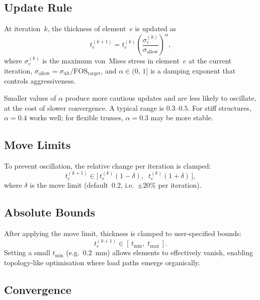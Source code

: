 \subsection{Update Rule}

At iteration~$k$, the thickness of element~$e$ is updated as
%
\begin{equation}
\label{eq:fsd_update}
    t^{(k+1)}_e = t^{(k)}_e \left( \frac{\sigma^{(k)}_e}{\sigma_{\text{allow}}} \right)^{\!\alpha},
\end{equation}
%
where $\sigma^{(k)}_e$ is the maximum von~Mises stress in element~$e$ at
the current iteration, $\sigma_{\text{allow}} = \sigma_{\text{ult}} / \text{FOS}_{\text{target}}$,
and $\alpha \in (0,\,1]$ is a damping exponent that controls aggressiveness.

\begin{notebox}
Smaller values of $\alpha$ produce more cautious updates and are less
likely to oscillate, at the cost of slower convergence.  A typical range
is $0.3$--$0.5$.  For stiff structures, $\alpha = 0.4$ works well; for
flexible trusses, $\alpha = 0.3$ may be more stable.
\end{notebox}

\subsection{Move Limits}

To prevent oscillation, the relative change per iteration is clamped:
%
\begin{equation}
    t^{(k+1)}_e \in \Big[\, t^{(k)}_e (1 - \delta),\;\; t^{(k)}_e (1 + \delta) \,\Big],
\end{equation}
%
where $\delta$ is the move limit (default~$0.2$, i.e.\ $\pm 20\%$ per
iteration).

\subsection{Absolute Bounds}

After applying the move limit, thickness is clamped to user-specified bounds:
%
\begin{equation}
    t^{(k+1)}_e \in [\, t_{\min},\; t_{\max} \,].
\end{equation}
%
Setting a small $t_{\min}$ (e.g.\ $0.2$~mm) allows elements to effectively
vanish, enabling topology-like optimisation where load paths emerge
organically.

\subsection{Convergence}

